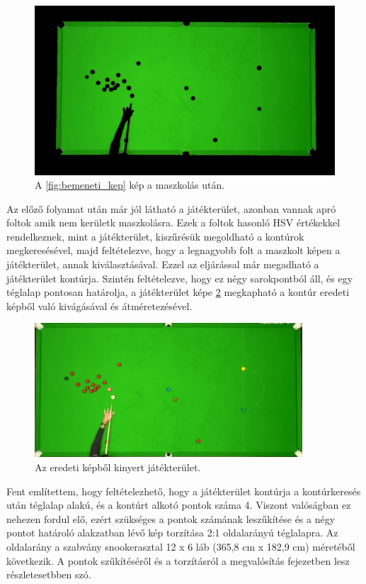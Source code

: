 \begin{figure}[!ht]
    \centering
    \includegraphics[width=115mm, keepaspectratio]{figures/input_screen_mask.png}
    \caption{A \ref{fig:bemeneti_kep} kép a maszkolás után.}
    \label{fig:bemeneti_kep_mask}
\end{figure}

\par Az előző folyamat után már jól látható a játékterület, azonban vannak apró foltok amik nem kerületk maszkolásra. Ezek a foltok hasonló HSV értékekkel rendelkeznek, mint a játékterület, kiszűrésük megoldható a kontúrok megkeresésével, majd feltételezve, hogy a legnagyobb folt a maszkolt képen a játékterület, annak kiválasztásával. Ezzel az eljárással már megadható a játékterület kontúrja. Szintén feltételezve, hogy ez négy sarokpontból áll, és egy téglalap pontosan határolja, a játékterület képe \ref{fig:bemeneti_asztal2} megkapható a kontúr eredeti képből való kivágásával és átméretezésével.

\begin{figure}[!ht]
    \centering
    \includegraphics[width=100mm, keepaspectratio]{figures/input_table.png}
    \caption{Az eredeti képből kinyert játékterület.}
    \label{fig:bemeneti_asztal2}
\end{figure}

\par Fent említettem, hogy feltételezhető, hogy a játékterület kontúrja a kontúrkeresés után téglalap alakú, és a kontúrt alkotó pontok száma 4. Viszont valóságban ez nehezen fordul elő, ezért szükséges a pontok számának leszűkítése és a négy pontot határoló alakzatban lévő kép torzítása 2:1 oldalarányú téglalapra. Az oldalarány a szabvány snookerasztal 12 x 6 láb (365,8 cm x 182,9 cm)\cite{snooker_rules} méretéből következik. A pontok szűkítéséről és a torzításról a megvalósítás fejezetben lesz részletesetbben szó.

